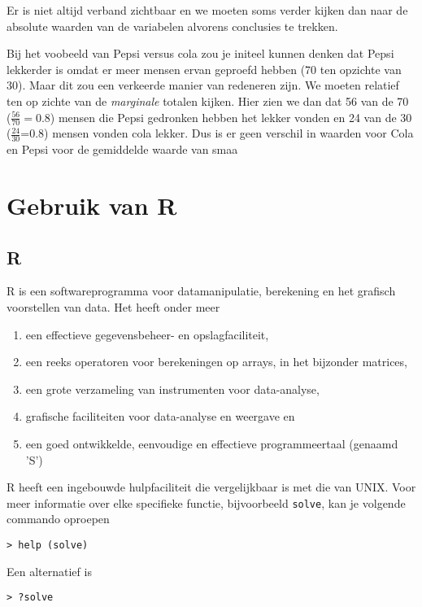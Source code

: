 Er is niet altijd verband zichtbaar en we moeten soms verder kijken dan naar de absolute waarden van de variabelen alvorens conclusies te trekken.

\begin{example}
	Bij het voobeeld van Pepsi versus cola zou je initeel kunnen denken dat Pepsi lekkerder is omdat er meer mensen ervan geproefd hebben (70 ten opzichte van 30). Maar dit zou een verkeerde manier van redeneren zijn. We moeten relatief ten op zichte van de  \textit{marginale} totalen kijken. Hier zien we dan dat 56 van de 70 ($\frac{56}{70} = 0.8$) mensen die Pepsi gedronken hebben het lekker vonden en 24 van de 30 ($\frac{24}{30}$=0.8) mensen vonden cola lekker. Dus is er geen verschil in waarden voor Cola en Pepsi voor de gemiddelde waarde van smaa 
\end{example}
\pagebreak
\section{Gebruik van R}
\subsection{R}
R is een softwareprogramma voor datamanipulatie, berekening en het grafisch voorstellen van data. Het heeft onder meer
\begin{enumerate}
	\item een effectieve gegevensbeheer- en opslagfaciliteit,
	\item een reeks operatoren voor berekeningen op arrays, in het bijzonder matrices,
	\item een grote verzameling van instrumenten voor data-analyse,
	\item grafische faciliteiten voor data-analyse en weergave en
	\item een goed ontwikkelde, eenvoudige en effectieve programmeertaal (genaamd 'S')
\end{enumerate}

R heeft een ingebouwde hulpfaciliteit die vergelijkbaar is met die van UNIX. Voor meer informatie over elke specifieke functie, bijvoorbeeld \texttt{solve}, kan je volgende commando oproepen
\begin{lstlisting}
> help (solve)
\end{lstlisting}

Een alternatief is
\begin{lstlisting}
> ?solve
\end{lstlisting}

